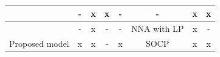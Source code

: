 \documentclass[preprint,12pt]{elsarticle}
\begin{document}
\begin{table}[htbp]
{\begin{tabular}{cccccccc}
\cite{b30,b31,b32,b33} & -                                                                                               & x                                                                         & x                                                                                               & -                                                                                                 & -                                                                    & x                                                                              & x                                                                  \\ \hline
\cite{b29}                                          & -                                                                                               & x                                                                         & -                                                                                               & -                                                                                                 & NNA with LP                                                          & x                                                                              & -                                                                  \\ \hline
Proposed model                                                                                                                                                & x                                                                                               & x                                                                         & -                                                                                               & x                                                                                                 & SOCP                                                                 & x                                                                              & x                                                                  \\ \hline
\end{tabular}%
}
\end{table}
\end{document}
